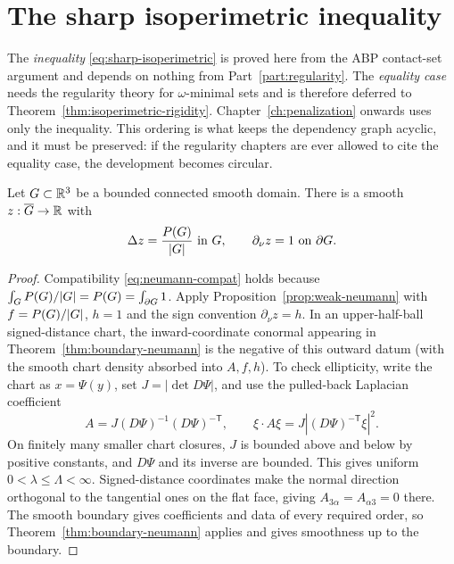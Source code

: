 \chapter{The sharp isoperimetric inequality}\label{ch:isoperimetric}

\begin{remark}[Acyclicity]\label{rem:acyclic-isoperimetric}
The \emph{inequality} \eqref{eq:sharp-isoperimetric} is proved here from the
ABP contact-set argument and depends on nothing from
Part~\ref{part:regularity}.  The \emph{equality case} needs the regularity
theory for $\omega$-minimal sets and is therefore deferred to
Theorem~\ref{thm:isoperimetric-rigidity}.  Chapter~\ref{ch:penalization}
onwards uses only the inequality.  This ordering is what keeps the dependency
graph acyclic, and it must be preserved: if the regularity chapters are ever
allowed to cite the equality case, the development becomes circular.
\end{remark}

\begin{lemma}\label{lem:abp-neumann}
Let $G\subset\mathbb R^3$ be a bounded connected smooth domain.  There is a smooth
$z:\overline G\to\mathbb R$ with
\begin{equation}\label{eq:neumann-abp}
  \Delta z=\frac{P(G)}{|G|}\ \text{in }G,
  \qquad
  \partial_\nu z=1\ \text{on }\partial G .
\end{equation}
\end{lemma}

\begin{proof}
Compatibility \eqref{eq:neumann-compat} holds because
$\int_GP(G)/|G|=P(G)=\int_{\partial G}1$.  Apply
Proposition~\ref{prop:weak-neumann} with $f=P(G)/|G|$, $h=1$ and the sign
convention $\partial_\nu z=h$.  In an upper-half-ball signed-distance chart,
the inward-coordinate conormal appearing in
Theorem~\ref{thm:boundary-neumann} is the negative of this outward datum
(with the smooth chart density absorbed into $A,f,h$).  To check ellipticity,
write the chart as $x=\Psi(y)$, set $J=|\det D\Psi|$, and use the pulled-back
Laplacian coefficient
\[
 A=J(D\Psi)^{-1}(D\Psi)^{-\mathsf T},
 \qquad \xi\cdot A\xi=J|(D\Psi)^{-\mathsf T}\xi|^2.
\]
On finitely many smaller chart closures, $J$ is bounded above and below by
positive constants, and $D\Psi$ and its inverse are bounded.  This gives
uniform $0<\lambda\le\Lambda<\infty$.  Signed-distance coordinates make the
normal direction orthogonal to the tangential ones on the flat face, giving
$A_{3\alpha}=A_{\alpha3}=0$ there.  The smooth boundary gives coefficients
and data of every required order, so Theorem~\ref{thm:boundary-neumann}
applies and gives smoothness up to the boundary.
\end{proof}

